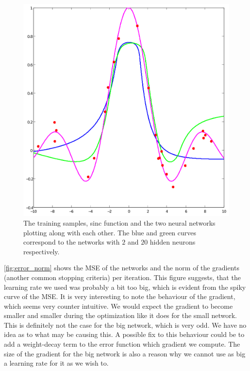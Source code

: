 \documentclass[11pt,a4paper]{article}
\begin{document}
\begin{figure}[htbp]
    \centering
    \includegraphics[width=\textwidth]{figures/functions.pdf}
    \caption{The training samples, sinc function and the two neural networks
        plotting along with each other. The blue and green curves correspond
    to the networks with $2$ and $20$ hidden neurons respectively.}
    \label{fig:func}
\end{figure}

\autoref{fig:error_norm} shows the MSE of the networks and the
norm of the gradients (another common stopping criteria) per iteration. This
figure suggests, that the learning rate we used was probably a bit too big,
which is evident from the spiky curve of the MSE. It is very interesting to
note the behaviour of the gradient, which seems very counter intuitive. We
would expect the gradient to become smaller and smaller during the
optimization like it does for the small network. This is definitely not the
case for the big network, which is very odd. We
have no idea as to what may be causing this. A possible fix to this behaviour
could be to add a weight-decay term to the error function which gradient we
compute. The size of the gradient for the big network is also a reason why we
cannot use as big a learning rate for it as we wish to.
\end{document}
